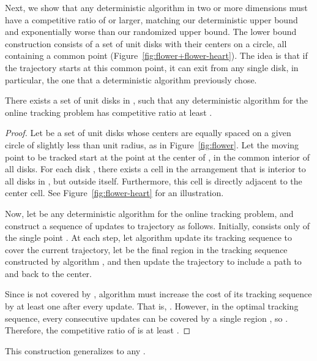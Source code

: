 \documentclass[runningheads]{llncs}
\begin{document}
Next, we show that any deterministic algorithm in two or more dimensions must have a competitive ratio of  or larger, matching our deterministic upper bound and exponentially worse than our randomized upper bound.  The lower bound construction consists of a set of  unit disks with their centers on a circle, all containing a common point (Figure~\ref {fig:flower+flower-heart}). The idea is that if the trajectory starts at this common point, it can exit from any single disk, in particular, the one that a deterministic algorithm previously chose.

\begin {theorem} \label {thm:lowerbound_determ}
There exists a set  of unit disks in , such that any deterministic algorithm for the online tracking problem has competitive ratio at least .
\end {theorem}

\begin {proof}
Let  be a set of  unit disks whose centers are equally spaced on a given circle  of slightly less than unit radius, as in Figure~\ref {fig:flower}. Let the moving point to be tracked start at the point  at the center of , in the common interior of all disks. For each disk , there exists a cell  in the arrangement that is interior to all disks in , but outside  itself. Furthermore, this cell is directly adjacent to the center cell. See Figure~\ref {fig:flower-heart} for an illustration.

Now, let  be any deterministic algorithm for the online tracking problem, and construct a sequence of updates to trajectory  as follows. Initially,  consists only of the single point . At each step, let algorithm  update its tracking sequence to cover the current trajectory, let  be the final region in the tracking sequence constructed by algorithm , and then update the trajectory to include a path to  and back to the center.

Since  is not covered by , algorithm  must increase the cost of its tracking sequence by at least one after every update. That is, . However, in the optimal tracking sequence, every  consecutive updates can be covered by a single region , so . Therefore, the competitive ratio of  is at least .
\end {proof}
      
This construction generalizes to any .
\end{document}
